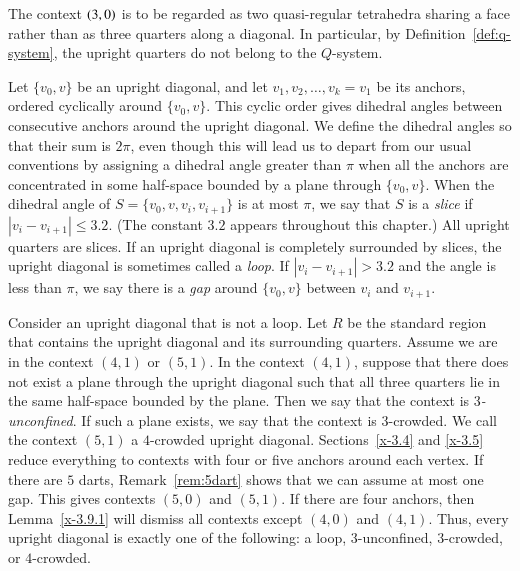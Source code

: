 The context $\relax(3,0)$ is to be regarded as two
quasi-regular tetrahedra sharing a face rather than as three
quarters along a diagonal.  In particular, by
Definition~\ref{def:q-system}, the upright quarters do not belong
to the $Q$-system.


\begin{definition}
Let $\{v_0,v\}$ be an upright diagonal, and let
$v_1,v_2,\ldots,v_k=v_1$ be its anchors, ordered cyclically around
$\{v_0,v\}$.  This cyclic order gives dihedral angles between
consecutive anchors around the upright diagonal. We define the
dihedral angles so that their sum is $2\pi$, even though this will
lead us to depart from our usual conventions by assigning a
dihedral angle greater than $\pi$ when all the anchors are
concentrated in some half-space bounded by a plane through
$\{v_0,v\}$. When the dihedral angle of $S=\{v_0,v,v_i,v_{i+1}\}$ is at
most $\pi$, we say that $S$ is a {\it slice\/} if
$|v_i-v_{i+1}|\le3.2$. (The constant $3.2$ appears throughout this
chapter.) All upright quarters are slices. If an upright
diagonal is completely surrounded by slices, the
upright diagonal is sometimes called a {\it loop}. If
$|v_i-v_{i+1}|>3.2$ and the angle is less than $\pi$, we say there
is a {\it gap\/} around $\{v_0,v\}$ between $v_i$ and $v_{i+1}$.
\end{definition}

\begin{definition}
Consider an upright diagonal that is not a loop. Let $R$ be the
standard region that contains the upright diagonal and its
surrounding quarters.  Assume we are in the context $(4,1)$ or
$(5,1)$.  In the context $(4,1)$, suppose that there does not exist
a plane through the upright diagonal such that all three quarters
lie in the same half-space bounded by the plane. Then we say that
the context is {\it $3$-unconfined}. If such a plane exists, we say
that the context is $3$-crowded. We call the context $(5,1)$ a
$4$-crowded upright diagonal. Sections~\ref{x-3.4} and \ref{x-3.5}
reduce everything to contexts with four or five anchors around each
vertex.  If there are $5$ darts, 
Remark~\ref{rem:5dart} shows that we can assume at most one
gap. This gives contexts $(5,0)$ and $(5,1)$.  If there are four
anchors, then Lemma~\ref{x-3.9.1} will dismiss all contexts except
$(4,0)$ and $(4,1)$. Thus, every upright diagonal is exactly one of
the following: a loop, $3$-unconfined, $3$-crowded, or $4$-crowded.
\end{definition}

